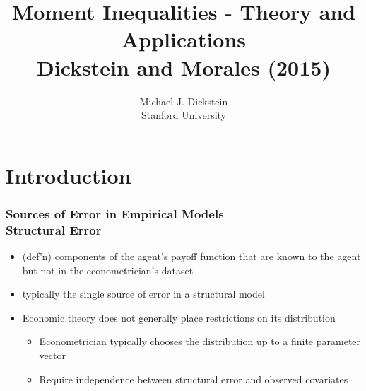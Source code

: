 %



\title[Moment Inequalities]{Moment Inequalities - Theory and Applications\\
Dickstein and Morales (2015)}
\author[MJ Dickstein]{Michael J. Dickstein \\
Stanford University}


\begin{frame}
\titlepage
\end{frame}


\section{Introduction}


\begin{frame}
\frametitle{{Sources of Error in Empirical Models}\\{Structural Error}}

\begin{itemize}
\item (def'n) components of the agent's payoff function that are known to
the agent but not in the econometrician's dataset

\item typically the single source of error in a structural model

\item Economic theory does not generally place restrictions on its
distribution

\begin{itemize}
\item Econometrician typically chooses the distribution up to a finite
parameter vector 

\item Require independence between structural error and observed covariates
\end{itemize}
\end{itemize}
\end{frame}

